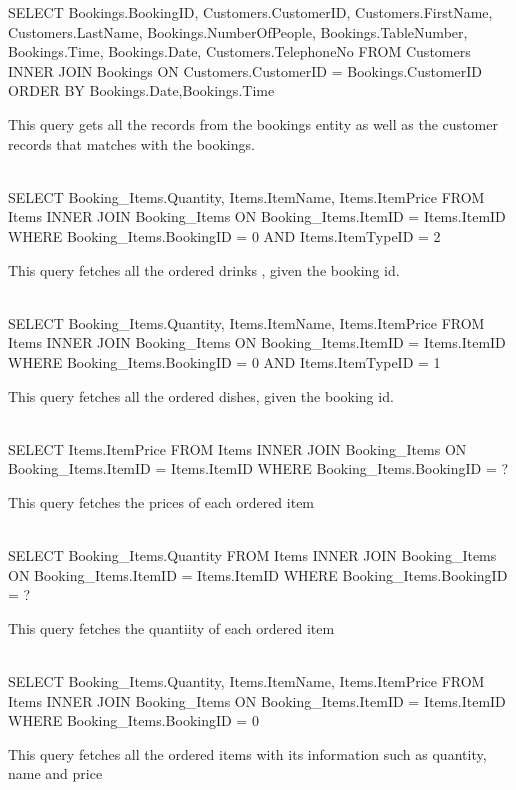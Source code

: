 \begin{sql}
SELECT
 Bookings.BookingID,
 Customers.CustomerID,
Customers.FirstName,
Customers.LastName,
Bookings.NumberOfPeople,
 Bookings.TableNumber,
 Bookings.Time,
Bookings.Date,
Customers.TelephoneNo
 FROM Customers
 INNER JOIN Bookings
 ON Customers.CustomerID = Bookings.CustomerID
 ORDER BY Bookings.Date,Bookings.Time
\end{sql}
This query gets all the records from the bookings entity as well as the customer records that matches with the bookings. \\ \\

\begin{sql}
SELECT
Booking_Items.Quantity,
 Items.ItemName,
 Items.ItemPrice
 FROM Items
 INNER JOIN Booking_Items
ON Booking_Items.ItemID = Items.ItemID
 WHERE Booking_Items.BookingID = {0}
AND Items.ItemTypeID = 2
\end{sql}
This query fetches all the ordered drinks , given the booking id. \\ \\

\begin{sql}
SELECT
 Booking_Items.Quantity,
 Items.ItemName,
 Items.ItemPrice
 FROM Items
 INNER JOIN Booking_Items
ON Booking_Items.ItemID = Items.ItemID
 WHERE Booking_Items.BookingID = {0}
 AND Items.ItemTypeID = 1
\end{sql}
This query fetches all the ordered dishes, given the booking id. \\ \\

\begin{sql}
SELECT
Items.ItemPrice
 FROM Items
 INNER JOIN Booking_Items
 ON Booking_Items.ItemID = Items.ItemID
WHERE Booking_Items.BookingID = ?
\end{sql}
This query fetches the prices of each ordered item \\ \\


\begin{sql}
SELECT
 Booking_Items.Quantity
 FROM Items
 INNER JOIN Booking_Items
 ON Booking_Items.ItemID = Items.ItemID
 WHERE Booking_Items.BookingID = ? 
\end{sql}
This query fetches the quantiity of each ordered item \\ \\

\begin{sql}
SELECT
 Booking_Items.Quantity,
 Items.ItemName,
 Items.ItemPrice
 FROM Items
 INNER JOIN Booking_Items
 ON Booking_Items.ItemID = Items.ItemID
 WHERE Booking_Items.BookingID = {0}
\end{sql}
This query fetches all the ordered items with its information such as quantity, name and price \\ \\


